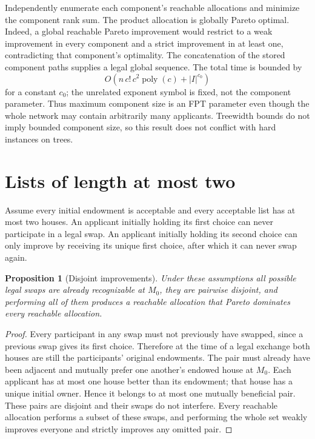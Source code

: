 \documentclass[11pt]{article}
\newtheorem{proposition}{Proposition}
\begin{document}
Independently enumerate each component's reachable allocations and minimize the component rank sum. The product allocation is globally Pareto optimal. Indeed, a global reachable Pareto improvement would restrict to a weak improvement in every component and a strict improvement in at least one, contradicting that component's optimality. The concatenation of the stored component paths supplies a legal global sequence. The total time is bounded by
\[
 O(n\,c!\,c^2\operatorname{poly}(c)+|I|^{c_0})
\]
for a constant $c_0$; the unrelated exponent symbol is fixed, not the component parameter. Thus maximum component size is an FPT parameter even though the whole network may contain arbitrarily many applicants. Treewidth bounds do not imply bounded component size, so this result does not conflict with hard instances on trees.

\section*{Lists of length at most two}
Assume every initial endowment is acceptable and every acceptable list has at most two houses. An applicant initially holding its first choice can never participate in a legal swap. An applicant initially holding its second choice can only improve by receiving its unique first choice, after which it can never swap again.

\begin{proposition}[Disjoint improvements]
Under these assumptions all possible legal swaps are already recognizable at $M_0$, they are pairwise disjoint, and performing all of them produces a reachable allocation that Pareto dominates every reachable allocation.
\end{proposition}
\begin{proof}
Every participant in any swap must not previously have swapped, since a previous swap gives its first choice. Therefore at the time of a legal exchange both houses are still the participants' original endowments. The pair must already have been adjacent and mutually prefer one another's endowed house at $M_0$. Each applicant has at most one house better than its endowment; that house has a unique initial owner. Hence it belongs to at most one mutually beneficial pair. These pairs are disjoint and their swaps do not interfere. Every reachable allocation performs a subset of these swaps, and performing the whole set weakly improves everyone and strictly improves any omitted pair.
\end{proof}
\end{document}
